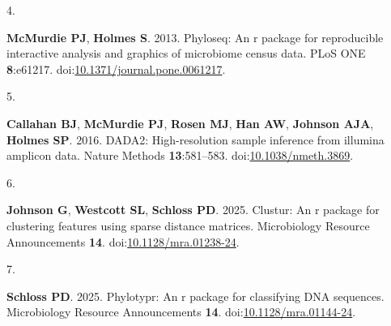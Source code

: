 \documentclass[
  11pt,
]{article}
\newlength{\cslhangindent}
\newlength{\csllabelwidth}
\newenvironment{CSLReferences}[2] %
 {\begin{list}{}{%
  \setlength{\itemindent}{0pt}
  \setlength{\leftmargin}{0pt}
  \setlength{\parsep}{0pt}
  \ifodd #1
   \setlength{\leftmargin}{\cslhangindent}
   \setlength{\itemindent}{-1\cslhangindent}
  \fi
  \setlength{\itemsep}{#2\baselineskip}}}
 {\end{list}}
\newcommand{\CSLLeftMargin}[1]{\parbox[t]{\csllabelwidth}{\strut#1\strut}}
\newcommand{\CSLRightInline}[1]{\parbox[t]{\linewidth - \csllabelwidth}{\strut#1\strut}}
\begin{document}
\begin{CSLReferences}{0}{1}
\CSLLeftMargin{4. }%
\CSLRightInline{\textbf{McMurdie PJ}, \textbf{Holmes S}. 2013. Phyloseq:
An r package for reproducible interactive analysis and graphics of
microbiome census data. PLoS ONE \textbf{8}:e61217.
doi:\href{https://doi.org/10.1371/journal.pone.0061217}{10.1371/journal.pone.0061217}.}

\CSLLeftMargin{5. }%
\CSLRightInline{\textbf{Callahan BJ}, \textbf{McMurdie PJ},
\textbf{Rosen MJ}, \textbf{Han AW}, \textbf{Johnson AJA}, \textbf{Holmes
SP}. 2016. DADA2: High-resolution sample inference from illumina
amplicon data. Nature Methods \textbf{13}:581--583.
doi:\href{https://doi.org/10.1038/nmeth.3869}{10.1038/nmeth.3869}.}

\CSLLeftMargin{6. }%
\CSLRightInline{\textbf{Johnson G}, \textbf{Westcott SL},
\textbf{Schloss PD}. 2025. Clustur: An r package for clustering features
using sparse distance matrices. Microbiology Resource Announcements
\textbf{14}.
doi:\href{https://doi.org/10.1128/mra.01238-24}{10.1128/mra.01238-24}.}

\CSLLeftMargin{7. }%
\CSLRightInline{\textbf{Schloss PD}. 2025. Phylotypr: An r package for
classifying DNA sequences. Microbiology Resource Announcements
\textbf{14}.
doi:\href{https://doi.org/10.1128/mra.01144-24}{10.1128/mra.01144-24}.}

\end{CSLReferences}
\end{document}

